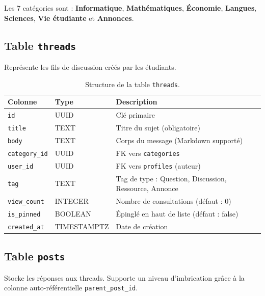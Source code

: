 \documentclass[12pt, a4paper]{report}
\begin{document}
Les 7 catégories sont : \textbf{Informatique}, \textbf{Mathématiques}, \textbf{Économie}, \textbf{Langues}, \textbf{Sciences}, \textbf{Vie étudiante} et \textbf{Annonces}.

\subsection{Table \texttt{threads}}

Représente les fils de discussion créés par les étudiants.

\begin{table}[H]
\centering
\renewcommand{\arraystretch}{1.3}
\begin{tabularx}{\textwidth}{l l X}
\toprule
\textbf{Colonne} & \textbf{Type} & \textbf{Description} \\
\midrule
\texttt{id} & UUID & Clé primaire \\
\texttt{title} & TEXT & Titre du sujet (obligatoire) \\
\texttt{body} & TEXT & Corps du message (Markdown supporté) \\
\texttt{category\_id} & UUID & FK vers \texttt{categories} \\
\texttt{user\_id} & UUID & FK vers \texttt{profiles} (auteur) \\
\texttt{tag} & TEXT & Tag de type : Question, Discussion, Ressource, Annonce \\
\texttt{view\_count} & INTEGER & Nombre de consultations (défaut : 0) \\
\texttt{is\_pinned} & BOOLEAN & Épinglé en haut de liste (défaut : false) \\
\texttt{created\_at} & TIMESTAMPTZ & Date de création \\
\bottomrule
\end{tabularx}
\caption{Structure de la table \texttt{threads}.}
\end{table}

\subsection{Table \texttt{posts}}

Stocke les réponses aux threads. Supporte un niveau d'imbrication grâce à la colonne auto-référentielle \texttt{parent\_post\_id}.
\end{document}
